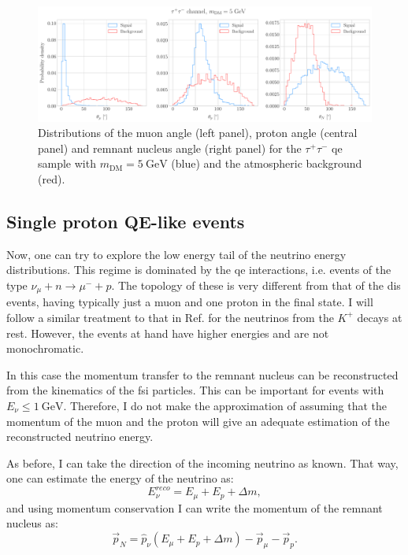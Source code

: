 \begin{figure}[t]
	\centering
	\includegraphics[width=0.95\linewidth]{Images/DM_Analysis/solardm_tau_5_qel_angular_dists.pdf}
	\caption[Angular distributions for the $\tau^{+}\tau^{-}$ \gls{qe} sample with $m_{\mathrm{DM}} = 5 \ \mathrm{GeV}$ and the atmospheric background.]{Distributions of the muon angle (left panel), proton angle (central panel) and remnant nucleus angle (right panel) for the $\tau^{+}\tau^{-}$ \gls{qe} sample with $m_{\mathrm{DM}} = 5 \ \mathrm{GeV}$ (blue) and the atmospheric background (red).}
	\label{fig:solardm_tau_5_qel_angular_dists}
\end{figure}

\subsection{Single proton QE-like events}

Now, one can try to explore the low energy tail of the neutrino energy distributions. This regime is dominated by the \gls{qe} interactions, i.e. events of the type $\nu_{\mu} + n \rightarrow \mu^{-} + p$. The topology of these is very different from that of the \gls{dis} events, having typically just a muon and one proton in the final state. I will follow a similar treatment to that in Ref. \cite{DUNE2021} for the neutrinos from the $K^{+}$ decays at rest. However, the events at hand have higher energies and are not monochromatic.

In this case the momentum transfer to the remnant nucleus can be reconstructed from the kinematics of the \gls{fsi} particles. This can be important for events with $E_{\nu} \leq 1 ~ \mathrm{GeV}$. Therefore, I do not make the approximation of assuming that the momentum of the muon and the proton will give an adequate estimation of the reconstructed neutrino energy.

As before, I can take the direction of the incoming neutrino as known. That way, one can estimate the energy of the neutrino as:
\begin{equation}\label{6.6}
	E_{\nu}^{reco} = E_{\mu} + E_{p} + \Delta m,
\end{equation}
and using momentum conservation I can write the momentum of the remnant nucleus as:
\begin{equation}\label{6.7}
	\vec{p}_{N} = \hat{p}_{\nu} \left(E_{\mu} + E_{p} + \Delta m\right) - \vec{p}_{\mu} - \vec{p}_{p}.
\end{equation}

